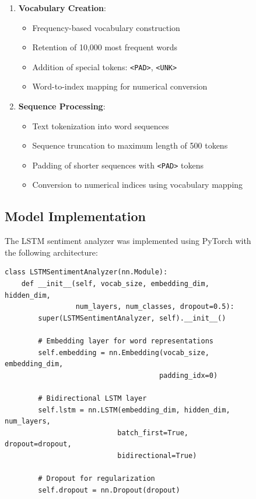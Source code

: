 \documentclass[a4paper, journal]{IEEEtran}
\begin{document}
\begin{figure}[!t]
\begin{enumerate}
    \item \textbf{Vocabulary Creation}:
    \begin{itemize}
        \item Frequency-based vocabulary construction
        \item Retention of 10,000 most frequent words
        \item Addition of special tokens: \texttt{<PAD>}, \texttt{<UNK>}
        \item Word-to-index mapping for numerical conversion
    \end{itemize}
    
    \item \textbf{Sequence Processing}:
    \begin{itemize}
        \item Text tokenization into word sequences
        \item Sequence truncation to maximum length of 500 tokens
        \item Padding of shorter sequences with \texttt{<PAD>} tokens
        \item Conversion to numerical indices using vocabulary mapping
    \end{itemize}
\end{enumerate}

\subsection{Model Implementation}

The LSTM sentiment analyzer was implemented using PyTorch with the following architecture:

\begin{lstlisting}[caption=LSTM Model Architecture]
class LSTMSentimentAnalyzer(nn.Module):
    def __init__(self, vocab_size, embedding_dim, hidden_dim, 
                 num_layers, num_classes, dropout=0.5):
        super(LSTMSentimentAnalyzer, self).__init__()
        
        # Embedding layer for word representations
        self.embedding = nn.Embedding(vocab_size, embedding_dim, 
                                     padding_idx=0)
        
        # Bidirectional LSTM layer
        self.lstm = nn.LSTM(embedding_dim, hidden_dim, num_layers, 
                           batch_first=True, dropout=dropout, 
                           bidirectional=True)
        
        # Dropout for regularization
        self.dropout = nn.Dropout(dropout)
        

\end{lstlisting}
\end{figure}
\end{document}
